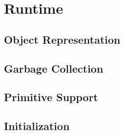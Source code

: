 \chapter{Runtime}
\label{chap:Runtime}

\section{Object Representation}

\section{Garbage Collection}

\section{Primitive Support}

\section{Initialization}
